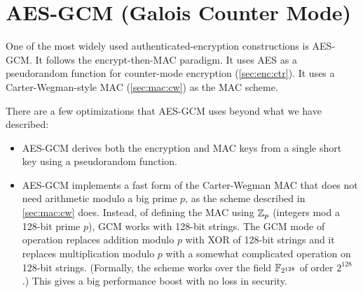 \section{AES-GCM (Galois Counter Mode)}\label{sec:enc:gcm}
One of the most widely used authenticated-encryption constructions is AES-GCM.
It follows the encrypt-then-MAC paradigm.
It uses AES as a pseudorandom function for counter-mode encryption (\cref{sec:enc:ctr}).
It uses a Carter-Wegman-style MAC (\cref{sec:mac:cw}) as the MAC scheme.

There are a few optimizations that AES-GCM uses beyond what we have described:
\begin{itemize}
  \item AES-GCM derives both the encryption and MAC keys from a single short key
        using a pseudorandom function.
  \item AES-GCM implements a fast form of the Carter-Wegman MAC that does not 
        need arithmetic modulo a big prime $p$, as the scheme described in \cref{sec:mac:cw} does.
        Instead, of defining the MAC using $\mathbb{Z}_p$ (integers mod a 128-bit prime $p$),
        GCM works with 128-bit strings.
        The GCM mode of operation replaces addition modulo $p$ with XOR of 128-bit strings
        and it replaces multiplication modulo $p$ with a somewhat complicated operation
        on 128-bit strings. 
        (Formally, the scheme works over the field $\mathbb{F}_{2^{128}}$ of order $2^{128}$.)
        This gives a big performance boost with no loss in security.
\end{itemize}


